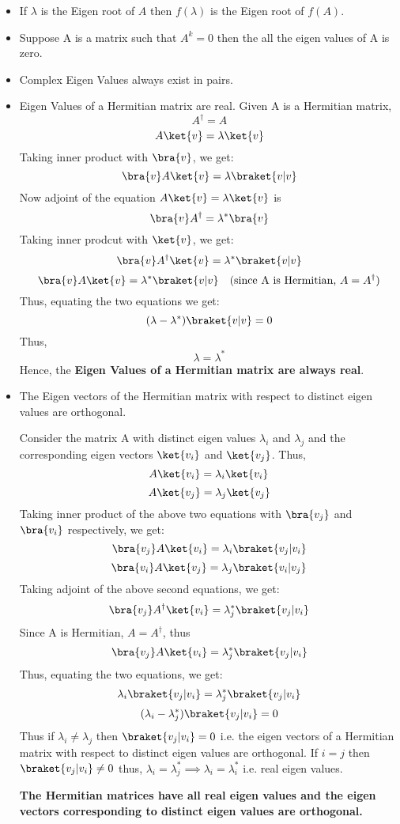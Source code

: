 \documentclass[12pt, oneside]{book}
\theoremstyle{definition}
\theoremstyle{definition}
\theoremstyle{remark}
\begin{document}
\begin{itemize}
    \item If $\lambda$ is the Eigen root of $A$ then $f(\lambda)$ is the Eigen root of $f(A)$.
    \item Suppose A is a matrix such that $A^k=0$ then the all the eigen values of A is zero.
    \item Complex Eigen Values always exist in pairs.
    \item Eigen Values of a Hermitian matrix are real.
    Given A is a Hermitian matrix,
    \[ A^{\dagger}=A \]
    \[A\ket{v}=\lambda\ket{v} \]
    Taking inner product with $\bra{v}$, we get:
    \[\bra{v}A\ket{v}=\lambda\braket{v|v} \]
    Now adjoint of the equation $A\ket{v}=\lambda\ket{v}$ is
    \[ \bra{v}A^{\dagger}=\lambda^*\bra{v} \]
    Taking inner prodcut with $\ket{v}$, we get:
    \[ \bra{v}A^{\dagger}\ket{v}=\lambda^*\braket{v|v} \]
    \[ \bra{v}A\ket{v}=\lambda^*\braket{v|v} \quad \text{(since A is Hermitian, $A=A^{\dagger} $)}\]
    Thus, equating the two equations we get:
    \[ (\lambda - \lambda^*) \braket{v|v}=0 \]
    Thus,
    \[ \lambda=\lambda^* \]
    Hence, the \textbf{Eigen Values of a Hermitian matrix are always real}.
    \item The Eigen vectors of the Hermitian matrix with respect to distinct eigen values are orthogonal.
    
    Consider the matrix A with distinct eigen values $\lambda_i$ and $\lambda_j$ and the corresponding eigen vectors $\ket{v_i}$ and $\ket{v_j}$. Thus,
    \[ A\ket{v_i}=\lambda_i\ket{v_i} \]
    \[ A\ket{v_j}=\lambda_j\ket{v_j} \]
    Taking inner product of the above two equations with $\bra{v_j}$ and $\bra{v_i}$ respectively, we get:
    \[ \bra{v_j}A\ket{v_i}=\lambda_i\braket{v_j|v_i} \]
    \[ \bra{v_i}A\ket{v_j}=\lambda_j\braket{v_i|v_j} \]
    Taking adjoint of the above second equations, we get:
    \[ \bra{v_j}A^{\dagger}\ket{v_i}=\lambda_j^*\braket{v_j|v_i} \]
    Since A is Hermitian, $A=A^{\dagger}$, thus
    \[ \bra{v_j}A\ket{v_i}=\lambda_j^*\braket{v_j|v_i} \]
    Thus, equating the two equations, we get:
    \[ \lambda_i\braket{v_j|v_i}=\lambda_j^*\braket{v_j|v_i} \]
    \[ (\lambda_i-\lambda_j^*)\braket{v_j|v_i}=0 \]
    Thus if $\lambda_i \neq \lambda_j$ then $\braket{v_j|v_i}=0$ i.e. the eigen vectors of a Hermitian matrix with respect to distinct eigen values are orthogonal.
    If $i=j$ then $\braket{v_j|v_i} \neq 0$ thus, $\lambda_i=\lambda_j^* \implies \lambda_i=\lambda_i^*$ i.e. real eigen values.  

    \textbf{The Hermitian matrices have all real eigen values and the eigen vectors corresponding to distinct eigen values are orthogonal.}

\end{itemize}
\end{document}
